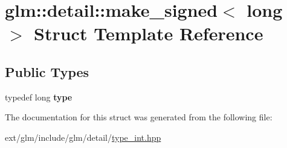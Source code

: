 \hypertarget{structglm_1_1detail_1_1make__signed_3_01long_01_4}{\section{glm\-:\-:detail\-:\-:make\-\_\-signed$<$ long $>$ Struct Template Reference}
\label{structglm_1_1detail_1_1make__signed_3_01long_01_4}
}
\subsection*{Public Types}
\begin{DoxyCompactItemize}
\item 
\hypertarget{structglm_1_1detail_1_1make__signed_3_01long_01_4_ab9807f0a681192166dd820195c967222}{typedef long {\bfseries type}}\label{structglm_1_1detail_1_1make__signed_3_01long_01_4_ab9807f0a681192166dd820195c967222}

\end{DoxyCompactItemize}


The documentation for this struct was generated from the following file\-:\begin{DoxyCompactItemize}
\item 
ext/glm/include/glm/detail/\hyperlink{type__int_8hpp}{type\-\_\-int.\-hpp}\end{DoxyCompactItemize}
